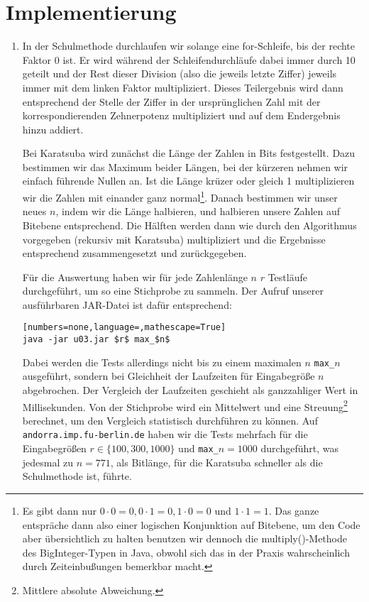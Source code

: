 \documentclass[a4paper,10pt]{scrartcl}
\begin{document}
\section{Implementierung}
\begin{enumerate}
\item   In der Schulmethode durchlaufen wir solange eine for-Schleife, bis der rechte Faktor 0 ist.
        Er wird während der Schleifendurchläufe dabei immer durch 10 geteilt und der Rest dieser Division (also die jeweils letzte Ziffer) jeweils immer mit dem linken Faktor multipliziert. Dieses Teilergebnis wird dann entsprechend der Stelle der Ziffer in der ursprünglichen Zahl mit der korrespondierenden Zehnerpotenz multipliziert und auf dem Endergebnis hinzu addiert.
        
        
        Bei Karatsuba wird zunächst die Länge der Zahlen in Bits festgestellt. Dazu bestimmen wir das Maximum beider Längen, bei der kürzeren nehmen wir einfach führende Nullen an. Ist die Länge krüzer oder gleich 1 multiplizieren wir die Zahlen mit einander ganz normal\footnote{Es gibt dann nur $0 \cdot 0 = 0, 0 \cdot 1 = 0, 1 \cdot 0 = 0$ und $1 \cdot 1 = 1$. Das ganze entspräche dann also einer logischen Konjunktion auf Bitebene, um den Code aber übersichtlich zu halten benutzen wir dennoch die multiply()-Methode des BigInteger-Typen in Java, obwohl sich das in der Praxis wahrscheinlich durch Zeiteinbußungen bemerkbar macht.}. 
        Danach bestimmen wir unser neues $n$, indem wir die Länge halbieren, und halbieren unsere Zahlen auf Bitebene entsprechend. Die Hälften werden dann wie durch den Algorithmus vorgegeben (rekursiv mit Karatsuba) multipliziert und die Ergebnisse entsprechend zusammengesetzt und zurückgegeben.
        
        Für die Auswertung haben wir für jede Zahlenlänge $n$ $r$ Testläufe durchgeführt, um so eine Stichprobe zu sammeln. Der Aufruf unserer ausführbaren JAR-Datei ist dafür entsprechend:
        \begin{lstlisting}[numbers=none,language=,mathescape=True]
java -jar u03.jar $r$ max_$n$ 
        \end{lstlisting}
        Dabei werden die Tests allerdings nicht bis zu einem maximalen $n$ \lstinline!max_!$n$ ausgeführt, sondern bei Gleichheit der Laufzeiten für Eingabegröße $n$ abgebrochen.
        Der Vergleich der Laufzeiten geschieht als ganzzahliger Wert in Millisekunden. Von der Stichprobe wird ein Mittelwert und eine Streuung\footnote{Mittlere absolute Abweichung.} berechnet, um den Vergleich statistisch durchführen zu können. Auf \texttt{andorra.imp.fu-berlin.de} haben wir die Tests mehrfach für die Eingabegrößen $r \in \{100, 300, 1000\}$ und \lstinline!max_!$n = 1000$ durchgeführt, was jedesmal zu $n = 771$, als Bitlänge, für die Karatsuba schneller als die Schulmethode ist, führte.
\end{enumerate}
\end{document}
